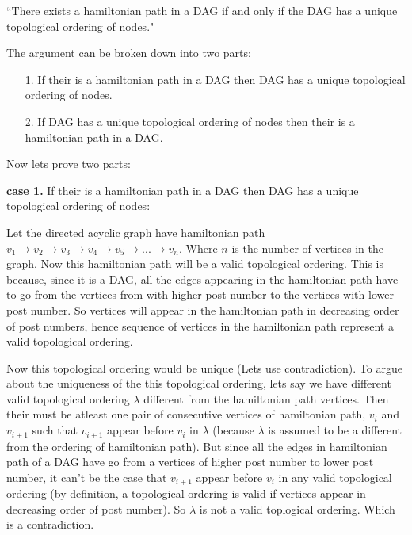 \documentclass[answers]{exam}
\begin{document}
\begin{questions}
\begin{solution}
``There exists a hamiltonian path in a DAG if and only if the DAG has a unique topological ordering of nodes."

The argument can be broken down into two parts:
\begin{enumerate}
    \item[1.] If their is a hamiltonian path in a DAG then DAG has a unique topological ordering of nodes.
    \item[2.] If DAG has a unique topological ordering of nodes then their is a hamiltonian path in a DAG.
\end{enumerate}

Now lets prove two parts:


    \textbf{case 1.} If their is a hamiltonian path in a DAG then DAG has a unique topological ordering of nodes:\par \par

    

    Let the directed acyclic graph have hamiltonian path $v_1\rightarrow v_2\rightarrow v_3\rightarrow v_4\rightarrow v_5\rightarrow...\rightarrow v_n$. Where $n$ is the number of vertices in the graph. Now this hamiltonian path will be a valid topological ordering. This is because, since it is a DAG, all the edges appearing in the hamiltonian path have to go from the vertices from with higher post number to the vertices with lower post number. 
    So vertices will appear in the hamiltonian path in decreasing order of post numbers, hence sequence of vertices in the hamiltonian path represent a valid topological ordering. 
    

    Now this topological ordering would be unique (Lets use contradiction). To argue about the uniqueness of the this topological ordering, lets say we have different valid topological ordering $\lambda$ different from the hamiltonian path vertices. Then their must be atleast one pair of consecutive vertices of hamiltonian path, $v_i$ and $v_{i+1}$ such that  $v_{i+1}$ appear before  $v_i$ in $\lambda$ (because $\lambda$ is assumed to be a different from the ordering of hamiltonian path). But since all the edges in hamiltonian path of a DAG have go from a vertices of higher post number to lower post number, it can't be the case that $v_{i+1}$ appear before  $v_i$ in any valid topological ordering (by definition, a topological ordering is valid if vertices appear in decreasing order of post number). So $\lambda$ is not a valid toplogical ordering. Which is a contradiction. 


\end{solution}
\end{questions}
\end{document}

